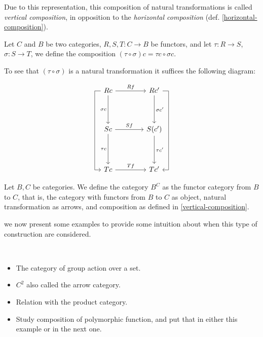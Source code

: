 Due to this representation, this composition of natural transformations is called \emph{vertical composition}, in opposition to the \emph{horizontal composition} (def. \ref{horizontal-composition}).

\begin{definition}\label{vertical-composition}
Let $C$ and $B$ be two categories, $R,S,T : C \to B$ be functors, and let $\tau: R \to S$, $\sigma:S\to T$, we define the composition $(\tau \circ \sigma)c = \tau c\circ \sigma c$.
\end{definition}

To see that $(\tau \circ \sigma)$ is a natural transformation it suffices the following diagram\cite{stack-composition-natural}:

$$
\begin{tikzcd}[row sep = 1.4cm, column sep = 1.4cm]
  R c
  \arrow[lddr, to path= { --
    ([xshift=-1ex]\tikztostart.west)
    -| ([xshift=-2ex]\tikztotarget.west)
    |- (\tikztotarget)}]
  \arrow[d, swap, "\sigma c"]
  \arrow[r, "R f"] 
  & R c'
  \arrow[d, "\sigma c'"]
  \arrow[rddl, to path= { --
    ([xshift=1ex]\tikztostart.east) 
    -| ([xshift=2ex]\tikztotarget.east)
    -- (\tikztotarget)}, "\sigma \circ \tau c'"]
  \\
  S c
  \arrow[d, swap, "\tau c "] 
  \arrow[r, "S f "] & S(c')
  \arrow[d, "\tau c'"] \\
  T c 
  \arrow[r, "T f"] & T c'
\end{tikzcd}
$$



\begin{definition}
  Let $B,C$ be categories. We define the category $B^C$ as the functor category from $B$ to $C$, that is, the category with functors from $B$ to $C$ as object, natural transformation as arrows, and composition as defined in \ref{vertical-composition}.
\end{definition}

we now present some examples to provide some intuition about when this type of construction are considered.

\begin{example}\ 
  \begin{itemize}
  \item The category of group action over a set.
  \item $C^2$ also called the arrow category.
  \item Relation with the product category.
  \item Study composition of polymorphic function, and put that in either this example or in the next one.
  \end{itemize}
\end{example}

